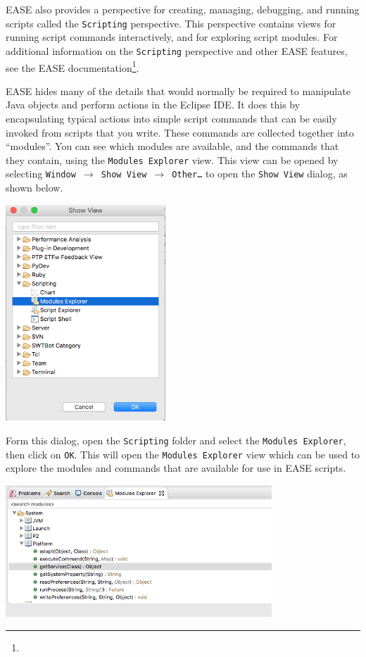 EASE also provides a perspective for creating, managing, debugging, and running
scripts called the \texttt{Scripting} perspective. This perspective contains
views for running script commands interactively, and for exploring script modules.
For additional information on the
\texttt{Scripting} perspective and other EASE features, see the EASE
documentation\footnote{}.

EASE hides many of the details that would normally be required to manipulate
Java objects and perform actions in the Eclipse IDE. It does this by
encapsulating typical actions into simple script commands that can be easily
invoked from scripts that you write. These commands are collected together into
``modules''. You can see which modules are available, and the commands that they
contain, using the \texttt{Modules Explorer} view. This view can be opened by
selecting \texttt{Window $\rightarrow$ Show View $\rightarrow$ Other\ldots} to
open the \texttt{Show View} dialog, as shown below.

\begin{center}
\includegraphics[width=6cm]{images/showview}
\end{center}

Form this dialog, open the \texttt{Scripting} folder and select the
\texttt{Modules Explorer}, then click on \texttt{OK}. This will open the
\texttt{Modules Explorer} view which can be used to explore the modules and commands
that are available for use in EASE scripts.

\begin{center}
\includegraphics[width=10cm]{images/modulesexplorer}
\end{center}

